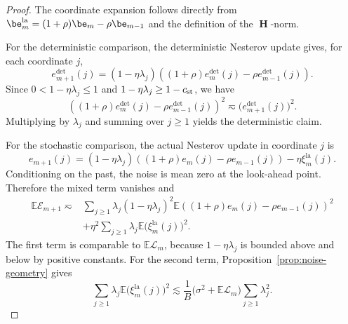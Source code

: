 \documentclass[11pt]{article}
\newcommand{\la}{\mathrm{la}}
\begin{document}
\begin{proof}

The coordinate expansion follows directly from \(\be_m^{\la}=(1+\rho)\be_m-\rho\be_{m-1}\) and the definition of the \(\operatorname{\bm H}\)-norm.

For the deterministic comparison, the deterministic Nesterov update gives, for each coordinate \(j\),
\[
    e_{m+1}^{\mathrm{det}}(j)
    =
    (1-\eta\lambda_j)
    \left((1+\rho)e_m^{\mathrm{det}}(j)-\rho e_{m-1}^{\mathrm{det}}(j)\right).
\]
Since \(0<1-\eta\lambda_j\le1\) and \(1-\eta\lambda_j\ge1-c_{\rm st}\), we have
\[
    \left((1+\rho)e_m^{\mathrm{det}}(j)-\rho e_{m-1}^{\mathrm{det}}(j)\right)^2
    \eqsim
    \bigl(e_{m+1}^{\mathrm{det}}(j)\bigr)^2.
\]
Multiplying by \(\lambda_j\) and summing over \(j\ge1\) yields the deterministic claim.

For the stochastic comparison, the actual Nesterov update in coordinate \(j\) is
\[
    e_{m+1}(j)
    =
    (1-\eta\lambda_j)
    \left((1+\rho)e_m(j)-\rho e_{m-1}(j)\right)
    -\eta\xi_m^{\la}(j).
\]
Conditioning on the past, the noise is mean zero at the look-ahead point.  Therefore the mixed term vanishes and
\[
\begin{aligned}
    \mathbb{E}\mathcal E_{m+1}
    \eqsim{}&
    \sum_{j\ge1}\lambda_j(1-\eta\lambda_j)^2
    \mathbb{E}\left((1+\rho)e_m(j)-\rho e_{m-1}(j)\right)^2 \\
    &+
    \eta^2\sum_{j\ge1}\lambda_j\mathbb{E}\bigl(\xi_m^{\la}(j)\bigr)^2 .
\end{aligned}
\]
The first term is comparable to \(\mathbb{E}\mathcal L_m\), because \(1-\eta\lambda_j\) is bounded above and below by positive constants.  For the second term, Proposition~\ref{prop:noise-geometry} gives
\[
    \sum_{j\ge1}\lambda_j\mathbb{E}\bigl(\xi_m^{\la}(j)\bigr)^2
    \lesssim
    \frac{1}{B}\bigl(\sigma^2+\mathbb{E}\mathcal L_m\bigr)
    \sum_{j\ge1}\lambda_j^2.
\]







\end{proof}
\end{document}
